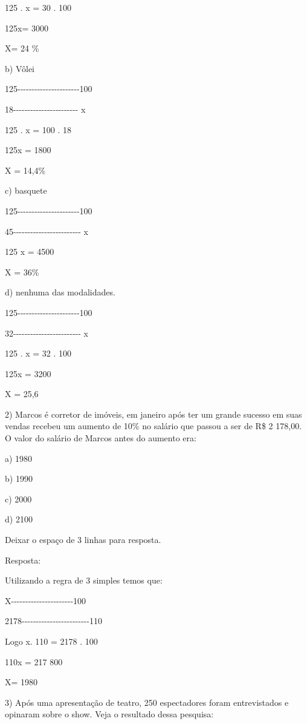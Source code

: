 {125 . x = 30 . 100

125x= 3000

X= 24 \%

b) Vôlei

125-\/-\/-\/-\/-\/-\/-\/-\/-\/-\/-\/-\/-\/-\/-\/-\/-\/-\/-\/-\/-\/-100

18-\/-\/-\/-\/-\/-\/-\/-\/-\/-\/-\/-\/-\/-\/-\/-\/-\/-\/-\/-\/-\/-\/- x

125 . x = 100 . 18

125x = 1800

X = 14,4\%

c) basquete

125-\/-\/-\/-\/-\/-\/-\/-\/-\/-\/-\/-\/-\/-\/-\/-\/-\/-\/-\/-\/-\/-100

45-\/-\/-\/-\/-\/-\/-\/-\/-\/-\/-\/-\/-\/-\/-\/-\/-\/-\/-\/-\/-\/-\/-\/-
x

125 x = 4500

X = 36\%

d) nenhuma das modalidades.

125-\/-\/-\/-\/-\/-\/-\/-\/-\/-\/-\/-\/-\/-\/-\/-\/-\/-\/-\/-\/-\/-100

32-\/-\/-\/-\/-\/-\/-\/-\/-\/-\/-\/-\/-\/-\/-\/-\/-\/-\/-\/-\/-\/-\/-\/-
x

125 . x = 32 . 100

125x = 3200

X = 25,6

2) Marcos é corretor de imóveis, em janeiro após ter um grande sucesso
em suas vendas recebeu um aumento de 10\% no salário que passou a ser de
R\$ 2 178,00. O valor do salário de Marcos antes do aumento era:

a) 1980

b) 1990

c) 2000

d) 2100

Deixar o espaço de 3 linhas para resposta.

Resposta:

Utilizando a regra de 3 simples temos que:

X-\/-\/-\/-\/-\/-\/-\/-\/-\/-\/-\/-\/-\/-\/-\/-\/-\/-\/-\/-\/-\/-100

2178-\/-\/-\/-\/-\/-\/-\/-\/-\/-\/-\/-\/-\/-\/-\/-\/-\/-\/-\/-\/-\/-\/-\/-110

Logo x. 110 = 2178 . 100

110x = 217 800

X= 1980

3) Após uma apresentação de teatro, 250 espectadores foram entrevistados
e opinaram sobre o show. Veja o resultado dessa pesquisa:

}
